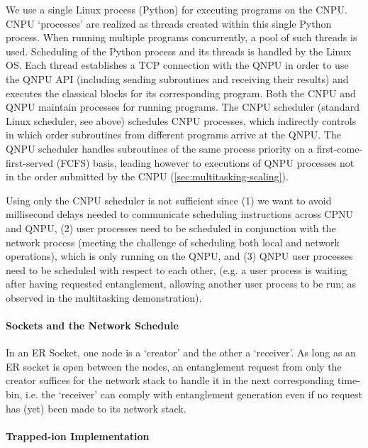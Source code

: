 We use a single Linux process (Python) for executing programs on the CNPU. CNPU `processes' are realized as threads created within this single Python process. When running multiple programs concurrently, a pool of such threads is used. Scheduling of the Python process and its threads is handled by the Linux OS. Each thread establishes a TCP connection with the QNPU in order to use the QNPU API (including sending subroutines and receiving their results) and executes the classical blocks for its corresponding program. 
Both the CNPU and QNPU maintain processes for running programs. The CNPU scheduler (standard Linux scheduler, see above) schedules CNPU processes, which indirectly controls in which order subroutines from different programs arrive at the QNPU. The QNPU scheduler handles subroutines of the same process priority on a first-come-first-served (FCFS) basis, leading however to executions of QNPU processes not in the order submitted by the CNPU (\cref{sec:multitasking-scaling}).

Using only the CNPU scheduler is not sufficient since (1) we want to avoid millisecond delays needed to communicate scheduling instructions across CPNU and QNPU, (2) user processes need to be scheduled in conjunction with the network process (meeting the challenge of scheduling both local and network operations), which is only running on the QNPU, and (3) QNPU user processes need to be scheduled with respect to each other, (e.g. a user process is waiting after having requested entanglement, allowing another user process to be run; as observed in the multitasking demonstration). 

\paragraph{Sockets and the Network Schedule}
In an ER Socket, one node is a `creator' and the other a `receiver'. As long as an ER socket is open between the nodes, an entanglement request from only the creator suffices for the network stack to handle it in the next corresponding time-bin, i.e. the `receiver' can comply with entanglement generation even if no request has (yet) been made to its network stack.

\paragraph{Trapped-ion Implementation}

